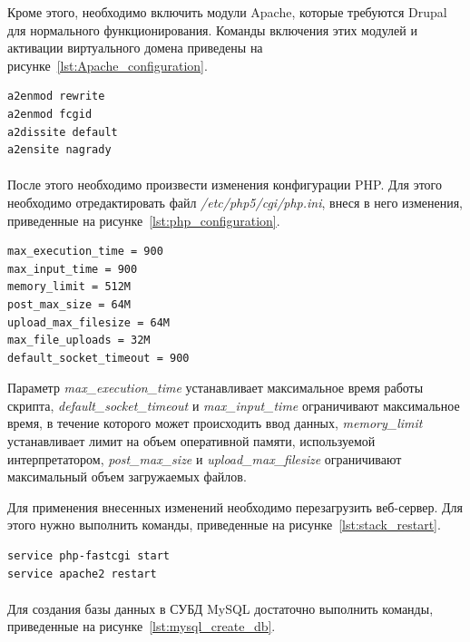 Кроме этого, необходимо включить модули Apache, которые требуются Drupal для 
нормального функционирования. Команды включения этих модулей и активации 
виртуального домена приведены на рисунке~\ref{lst:Apache_configuration}.

\begin{lstlisting}[language=bash,
  caption=Команды включения дополнительных модулей
  Apache и активации виртуального домена,
  label=lst:Apache_configuration]
a2enmod rewrite
a2enmod fcgid
a2dissite default
a2ensite nagrady
\end{lstlisting}

\paragraph{}
После этого необходимо произвести изменения конфигурации PHP.
Для этого необходимо отредактировать файл \textit{/etc/php5/cgi/php.ini},
внеся в него изменения, приведенные на рисунке~\ref{lst:php_configuration}.

\begin{lstlisting}[language=bash,
  caption=Измененные параметры файла php.ini,
  label=lst:php_configuration]
max_execution_time = 900
max_input_time = 900
memory_limit = 512M
post_max_size = 64M
upload_max_filesize = 64M
max_file_uploads = 32M
default_socket_timeout = 900
\end{lstlisting}

Параметр \textit{max\_execution\_time} устанавливает максимальное 
время работы скрипта,
\textit{default\_socket\_timeout} и \textit{max\_input\_time} ограничивают
максимальное время, в течение которого может происходить ввод данных,  
\textit{memory\_limit} устанавливает лимит на объем оперативной памяти,
используемой интерпретатором,
\textit{post\_max\_size} и \textit{upload\_max\_filesize} ограничивают
максимальный объем загружаемых файлов.

Для применения внесенных изменений необходимо перезагрузить веб-сервер. 
Для этого нужно выполнить команды, приведенные на рисунке~\ref{lst:stack_restart}. 

\begin{lstlisting}[language=bash,
  caption=Команды перезагрузки веб-сервера,
  label=lst:stack_restart]
service php-fastcgi start
service apache2 restart
\end{lstlisting}

\paragraph{}
Для создания базы данных в СУБД MySQL достаточно выполнить команды,
приведенные на рисунке~\ref{lst:mysql_create_db}.

